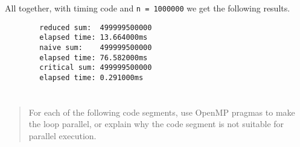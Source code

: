 \documentclass{article}
\begin{document}
    All together, with timing code and \texttt{n = 1000000} we get the following results.

    \begin{verbatim}
        reduced sum:  499999500000
        elapsed time: 13.664000ms
        naive sum:    499999500000
        elapsed time: 76.582000ms
        critical sum: 499999500000
        elapsed time: 0.291000ms
    \end{verbatim}

\section{}
    \begin{quote}
        For each of the following code segments, use OpenMP pragmas to make the loop parallel, or explain why the code segment is not suitable for parallel execution.






\end{quote}
\end{document}
